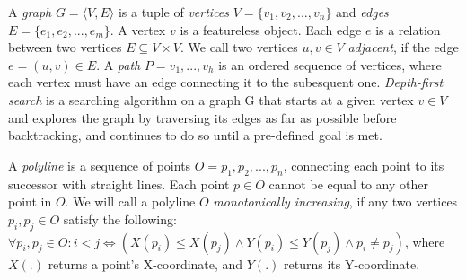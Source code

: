 \documentclass[11pt,a4paper]{vutinfth}
\begin{document}
A \emph{graph} $G=\langle V, E \rangle$ is a tuple of \emph{vertices} $V=\{v_1, v_2, ..., v_n\}$ and \emph{edges} $E=\{e_1, e_2, ..., e_m\}$. A vertex $v$ is a featureless object. %
 Each edge $e$ is a relation between two vertices $E \subseteq V\times V$. %
We call two vertices $u,v \in V$ \emph{adjacent}, if the edge $e=(u,v) \in E$.
 A \emph{path} $P=v_1, ..., v_h$ is an ordered sequence of vertices, where each vertex must have an edge connecting it to the subesquent one.
 \emph{Depth-first search} is a searching algorithm on a graph G that starts at a given vertex $v \in V$ and explores the graph by traversing its edges as far as possible before backtracking, and continues to do so until a pre-defined goal is met. 


A \emph{polyline} is a sequence of points $O=p_1, p_2, ...,p_n$, connecting each point to its successor with straight lines. Each point $p \in O$ cannot be equal to any other point in $O$.
We will call a polyline $O$ \emph{monotonically increasing}, if any two vertices $p_i, p_j \in O$ satisfy the following: $\forall p_i, p_j \in O: i<j \iff (X(p_i)\leq X(p_j) \land Y(p_i)\leq Y(p_j)\land p_i \neq p_j)$, where $X(.)$ returns a point's X-coordinate, and $Y(.)$ returns its Y-coordinate.
\end{document}
